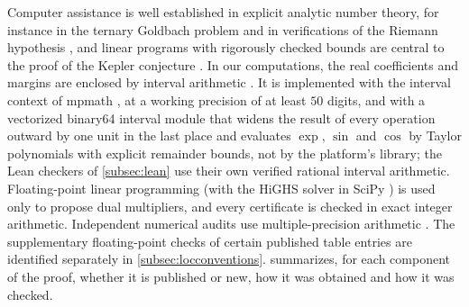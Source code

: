 \documentclass[11pt]{amsart}
\numberwithin{equation}{section}
\theoremstyle{plain}
\theoremstyle{definition}
\theoremstyle{remark}
\newcommand{\1}{\mathbf{1}}
\begin{document}
Computer assistance is well established in explicit analytic number theory, for instance in the
ternary Goldbach problem \cite{Helfgott2015ternary} and in verifications of the Riemann hypothesis
\cite{Platt2016numerical,PlattTrudgian2021riemann}, and linear programs with rigorously checked
bounds are central to the proof of the Kepler conjecture \cite{ObuaNipkow2009flyspeck,
SolovyevHales2011efficient,Hales2017formal}. In our computations, the real coefficients and
margins are enclosed by interval arithmetic \cite{Moore1966interval,MooreKearfottCloud2009introduction,
Rump2010verification,Tucker2011validated}. It is implemented with the interval context of mpmath
\cite{mpmath2023library}, at a working precision of at least $50$ digits, and with a vectorized
binary64 interval module that widens the result of every operation outward by one unit in the
last place and evaluates $\exp$, $\sin$ and $\cos$ by Taylor polynomials with explicit remainder
bounds, not by the platform's library; the Lean checkers of \cref{subsec:lean} use their own
verified rational interval arithmetic. Floating-point linear programming (with the HiGHS solver
\cite{HuangfuHall2018parallelizing} in SciPy \cite{Virtanen2020scipy}) is used only to propose dual
multipliers, and every certificate is checked in exact integer arithmetic. Independent
numerical audits use multiple-precision arithmetic \cite{mpmath2023library}.
The supplementary floating-point checks of certain published table entries are
identified separately in \cref{subsec:locconventions}.  summarizes, for each
component of the proof, whether it is published or new, how it was obtained and how it was
checked.
\end{document}
